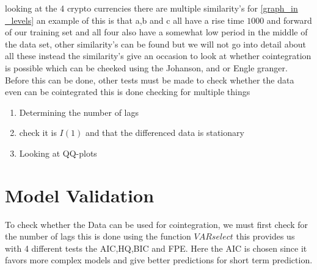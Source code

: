looking at the 4 crypto currencies there are multiple similarity's for \ref{graph_in _levels} an example of this is that a,b and c all have a rise time $1000$ and forward of our training set and all four also have a somewhat low period in the middle of the data set, other similarity's can be found but we will not go into detail about all these instead the similarity's give an occasion to look at whether cointegration is possible which can be cheeked using the Johanson, and or Engle granger. Before this can be done, other tests must be made to check whether the data even can be cointegrated this is done checking for multiple things 
\begin{enumerate}
    \item Determining the number of lags
    \item check it is $I(1)$ and that the differenced data is stationary 
    \item Looking at QQ-plots
\end{enumerate}

\section{Model Validation}
To check whether the Data can be used for cointegration, we must first check for the number of lags this is done using the function $VARselect$ this provides us with 4 different tests the AIC,HQ,BIC and FPE. Here the AIC is chosen since it favors more complex models and give better predictions for short term prediction.
\pause
